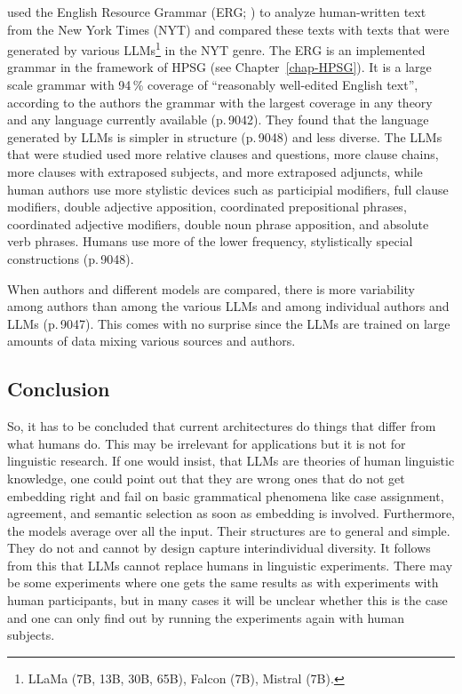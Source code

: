 \citet*{ZFBGR2025a} used the English Resource Grammar (ERG; \citealt{Flickinger2000a,Flickinger2011a-u}) to analyze human-written text from the New York Times (NYT)
and compared these texts with texts that were generated by various LLMs\footnote{
  LLaMa (7B, 13B, 30B, 65B), Falcon (7B), Mistral (7B).
} in the NYT genre.
The ERG is an implemented grammar in the framework of HPSG (see Chapter~\ref{chap-HPSG}). It is a large scale grammar with
94\,\% coverage of ``reasonably well-edited English text'', according to the authors the grammar with the largest coverage in any theory and
any language currently available (p.\,9042).
They found that the language generated by LLMs is simpler in structure (p.\,9048) and less diverse. 
The LLMs that were studied used more relative clauses and questions, more clause
chains, more clauses with extraposed subjects, and more extraposed adjuncts, while human authors use more stylistic devices such as participial
modifiers, full clause modifiers, double adjective apposition, coordinated prepositional phrases, coordinated adjective modifiers, double noun phrase
apposition, and absolute verb phrases. Humans use more of the lower frequency, stylistically special
constructions (p.\,9048).

When authors and different models are compared, there is more variability among authors than among the
various LLMs and among individual authors and LLMs (p.\,9047). This comes with no surprise since the LLMs are trained on large amounts of data mixing
various sources and authors.

\subsection{Conclusion}

So, it has to be concluded that current architectures do things that differ from what humans
do. This may be irrelevant for applications but it is not for linguistic research. If one would
insist, that LLMs are theories of human linguistic knowledge, one could point out that they are
wrong ones that do not get embedding right and fail on basic grammatical phenomena like case
assignment, agreement, and semantic selection as soon as embedding is involved. Furthermore, the models average over all the
input. Their structures are to general and simple. They do not and cannot by design capture
interindividual diversity. It follows from this that LLMs cannot replace humans in linguistic
experiments. There may be some experiments where one gets the same results as with experiments with
human participants, but in many cases it will be unclear whether this is the case and one can only
find out by running the experiments again with human subjects.

